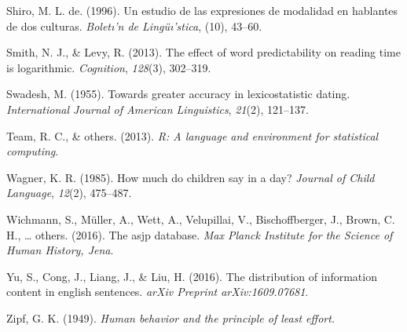 \documentclass[11pt,]{article}
\begin{document}
\leavevmode\hypertarget{ref-de1996estudio}{}%
Shiro, M. L. de. (1996). Un estudio de las expresiones de modalidad en hablantes de dos culturas. \emph{Boletı'n de Lingüı'stica}, (10), 43--60.

\leavevmode\hypertarget{ref-smith2013effect}{}%
Smith, N. J., \& Levy, R. (2013). The effect of word predictability on reading time is logarithmic. \emph{Cognition}, \emph{128}(3), 302--319.

\leavevmode\hypertarget{ref-swadesh1955towards}{}%
Swadesh, M. (1955). Towards greater accuracy in lexicostatistic dating. \emph{International Journal of American Linguistics}, \emph{21}(2), 121--137.

\leavevmode\hypertarget{ref-team2013r}{}%
Team, R. C., \& others. (2013). \emph{R: A language and environment for statistical computing}.

\leavevmode\hypertarget{ref-wagner1985much}{}%
Wagner, K. R. (1985). How much do children say in a day? \emph{Journal of Child Language}, \emph{12}(2), 475--487.

\leavevmode\hypertarget{ref-wichmann2016asjp}{}%
Wichmann, S., Müller, A., Wett, A., Velupillai, V., Bischoffberger, J., Brown, C. H., \ldots{} others. (2016). The asjp database. \emph{Max Planck Institute for the Science of Human History, Jena}.

\leavevmode\hypertarget{ref-yu2016distribution}{}%
Yu, S., Cong, J., Liang, J., \& Liu, H. (2016). The distribution of information content in english sentences. \emph{arXiv Preprint arXiv:1609.07681}.

\leavevmode\hypertarget{ref-zipf1949human}{}%
Zipf, G. K. (1949). \emph{Human behavior and the principle of least effort.}
\end{document}

